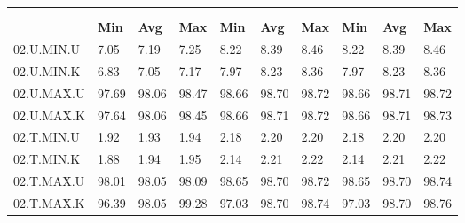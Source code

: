 \begin{tabular}{|>{\raggedright}p{}|>{\raggedright}p{}|>{\raggedright}p{}|>{\raggedright}p{}|>{\raggedright}p{}|>{\raggedright}p{}|>{\raggedright}p{}|>{\raggedright}p{}|>{\raggedright}p{}|>{\raggedright}p{}|}
\hline 
\multirow{3}{0.12\columnwidth}{\textbf{\footnotesize{}Bezeichnung}} & \multicolumn{9}{l|}{\textbf{\footnotesize{}TX-Bitrate {[}MBit/s{]}}}\tabularnewline
\cline{2-10} 
& \multicolumn{3}{l|}{\textbf{\footnotesize{}prp1}} & \multicolumn{3}{l|}{\textbf{\footnotesize{}eth0}} & \multicolumn{3}{l|}{\textbf{\footnotesize{}eth1}}\tabularnewline
\cline{2-10} 
& \textbf{\footnotesize{}Min} & \textbf{\footnotesize{}Avg} & \textbf{\footnotesize{}Max} & \textbf{\footnotesize{}Min} & \textbf{\footnotesize{}Avg} & \textbf{\footnotesize{}Max} & \textbf{\footnotesize{}Min} & \textbf{\footnotesize{}Avg} & \textbf{\footnotesize{}Max}\tabularnewline
\hline 
\hline 
{\footnotesize{}02.U.MIN.U} & {\footnotesize{}7.05} & {\footnotesize{}7.19} & {\footnotesize{}7.25} & {\footnotesize{}8.22} & {\footnotesize{}8.39} & {\footnotesize{}8.46} & {\footnotesize{}8.22} & {\footnotesize{}8.39} & {\footnotesize{}8.46}\tabularnewline
\hline 
\hline 
{\footnotesize{}02.U.MIN.K} & {\footnotesize{}6.83} & {\footnotesize{}7.05} & {\footnotesize{}7.17} & {\footnotesize{}7.97} & {\footnotesize{}8.23} & {\footnotesize{}8.36} & {\footnotesize{}7.97} & {\footnotesize{}8.23} & {\footnotesize{}8.36}\tabularnewline
\hline 
\hline 
{\footnotesize{}02.U.MAX.U} & {\footnotesize{}97.69} & {\footnotesize{}98.06} & {\footnotesize{}98.47} & {\footnotesize{}98.66} & {\footnotesize{}98.70} & {\footnotesize{}98.72} & {\footnotesize{}98.66} & {\footnotesize{}98.71} & {\footnotesize{}98.72}\tabularnewline
\hline 
\hline 
{\footnotesize{}02.U.MAX.K} & {\footnotesize{}97.64} & {\footnotesize{}98.06} & {\footnotesize{}98.45} & {\footnotesize{}98.66} & {\footnotesize{}98.71} & {\footnotesize{}98.72} & {\footnotesize{}98.66} & {\footnotesize{}98.71} & {\footnotesize{}98.73}\tabularnewline
\hline 
\hline 
{\footnotesize{}02.T.MIN.U} & {\footnotesize{}1.92} & {\footnotesize{}1.93} & {\footnotesize{}1.94} & {\footnotesize{}2.18} & {\footnotesize{}2.20} & {\footnotesize{}2.20} & {\footnotesize{}2.18} & {\footnotesize{}2.20} & {\footnotesize{}2.20}\tabularnewline
\hline 
\hline 
{\footnotesize{}02.T.MIN.K} & {\footnotesize{}1.88} & {\footnotesize{}1.94} & {\footnotesize{}1.95} & {\footnotesize{}2.14} & {\footnotesize{}2.21} & {\footnotesize{}2.22} & {\footnotesize{}2.14} & {\footnotesize{}2.21} & {\footnotesize{}2.22}\tabularnewline
\hline 
\hline 
{\footnotesize{}02.T.MAX.U} & {\footnotesize{}98.01} & {\footnotesize{}98.05} & {\footnotesize{}98.09} & {\footnotesize{}98.65} & {\footnotesize{}98.70} & {\footnotesize{}98.72} & {\footnotesize{}98.65} & {\footnotesize{}98.70} & {\footnotesize{}98.74}\tabularnewline
\hline 
\hline 
{\footnotesize{}02.T.MAX.K} & {\footnotesize{}96.39} & {\footnotesize{}98.05} & {\footnotesize{}99.28} & {\footnotesize{}97.03} & {\footnotesize{}98.70} & {\footnotesize{}98.74} & {\footnotesize{}97.03} & {\footnotesize{}98.70} & {\footnotesize{}98.76}\tabularnewline
\hline 
\end{tabular}
\par
